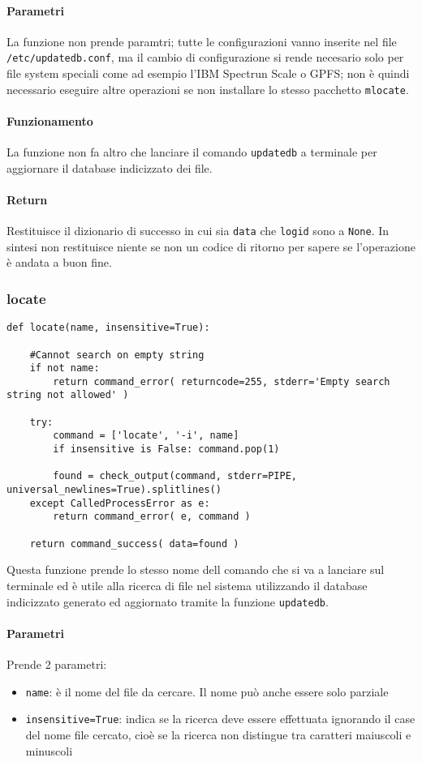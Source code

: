 \documentclass[11pt]{article}
\begin{document}
\paragraph{Parametri}
La funzione non prende paramtri; tutte le configurazioni vanno inserite nel file \texttt{/etc/updatedb.conf},
ma il cambio di configurazione si rende necesario solo per file system speciali come ad esempio l'IBM Spectrun Scale
o GPFS; non è quindi necessario eseguire altre operazioni se non installare lo stesso pacchetto \texttt{mlocate}.
\paragraph{Funzionamento}
La funzione non fa altro che lanciare il comando \texttt{updatedb} a terminale per aggiornare il database
indicizzato dei file.
\paragraph{Return}
Restituisce il dizionario di successo in cui sia \texttt{data} che \texttt{logid} sono a \texttt{None}.
In sintesi non restituisce niente se non un codice di ritorno per sapere se l'operazione è andata a buon fine.

\subsubsection{locate}\label{locate}
\begin{lstlisting}
def locate(name, insensitive=True):

    #Cannot search on empty string
    if not name:
        return command_error( returncode=255, stderr='Empty search string not allowed' )

    try:
        command = ['locate', '-i', name]
        if insensitive is False: command.pop(1)

        found = check_output(command, stderr=PIPE, universal_newlines=True).splitlines()
    except CalledProcessError as e:
        return command_error( e, command )

    return command_success( data=found )
\end{lstlisting}
Questa funzione prende lo stesso nome dell comando che si va a lanciare sul terminale ed è utile alla ricerca
di file nel sistema utilizzando il database indicizzato generato ed aggiornato tramite la funzione \texttt{updatedb}.
\paragraph{Parametri}
Prende 2 parametri:
\begin{itemize}
	\item{\texttt{name}: è il nome del file da cercare. Il nome può anche essere solo parziale}
	\item{\texttt{insensitive=True}: indica se la ricerca deve essere effettuata ignorando il case
		del nome file cercato, cioè se la ricerca non distingue tra caratteri maiuscoli e minuscoli}
\end{itemize}
\end{document}
